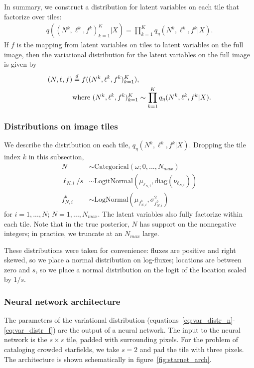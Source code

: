 In summary, we construct a distribution for latent variables on each tile that factorize over tiles: 
\begin{align}
    q((N^k, \ell^k, f^k)_{k = 1}^K|X) = \prod_{k = 1}^K q_\eta(N^k, \ell^k, f^k | X). 
\end{align}
If $f$ is the mapping from latent variables on tiles to latent variables on the full image, then the variational distribution for the latent variables on the full image is given by 
\begin{align}
    (N, \ell, f) &\stackrel{d}{=} f((N^k, \ell^k, f^k)_{k = 1}^K), \notag \\  
        &\text{where } (N^k, \ell^k, f^k)_{k = 1}^K \sim \prod_{k = 1}^K q_\eta(N^k, \ell^k, f^k | X). 
\end{align}

\subsubsection{Distributions on image tiles}
We describe the distribution on each tile, $q_\eta(N^k, \ell^k, f^k | X)$. 
Dropping the tile index $k$ in this subsection,
\begin{align}
    N &\sim \text{Categorical}(\omega; 0, ..., N_{max}) \label{eq:var_distr_n}\\
	\ell_{N, i} / s &\sim \text{LogitNormal}(\mu_{\ell_{N, i}}, \text{diag}(\nu_{\ell_{N, i}}) )\label{eq:var_distr_loc}\\
	f^b_{N, i} &\sim \text{LogNormal}(\mu_{f^b_{N, i}}, \sigma^2_{f^b_{N, i}}) \label{eq:var_distr_f}
\end{align}
for $i = 1, ..., N$; $N = 1, ..., N_{max}$. The latent variables also fully factorize within each tile. Note that in the true posterior, $N$ has support on the nonnegative integers; in practice, we truncate at an $N_{max}$ large. 

These distributions were taken for convenience: fluxes are positive and right skewed, so we place a normal distribution on log-fluxes; locations are between zero and $s$, so 
we place a normal distribution on the logit of the location scaled by $1 / s$. 

\subsubsection{Neural network architecture}
The parameters of the variational distribution (equations~\eqref{eq:var_distr_n}-\eqref{eq:var_distr_f}) are the output of a neural network. The input to the neural network is the $s \times s$ tile, padded with surrounding pixels. 
For the problem of cataloging crowded starfields, we take $s = 2$ and pad the tile with three pixels. The architecture is shown schematically in figure~\ref{fig:starnet_arch}. 


